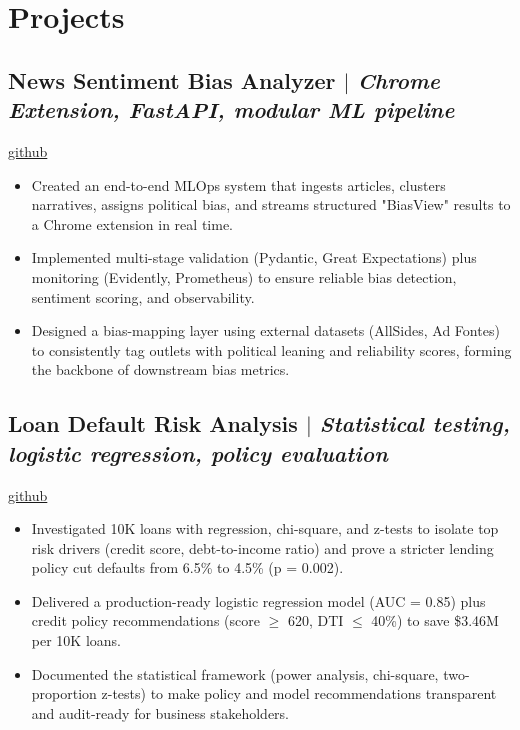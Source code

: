\documentclass[11pt,letterpaper]{article}
\begin{document}
\section*{Projects}

\subsection*{News Sentiment Bias Analyzer $\vert$ \normalfont\textit{Chrome Extension, FastAPI, modular ML pipeline}} \hfill \href{https://github.com/blue-jays/News_Bias_Check_Companion/}{github}
\begin{itemize}[leftmargin=*,noitemsep,topsep=2pt]
    \item Created an end-to-end MLOps system that ingests articles, clusters narratives, assigns political bias, and streams structured "BiasView" results to a Chrome extension in real time.
    \item Implemented multi-stage validation (Pydantic, Great Expectations) plus monitoring (Evidently, Prometheus) to ensure reliable bias detection, sentiment scoring, and observability.
    \item Designed a bias-mapping layer using external datasets (AllSides, Ad Fontes) to consistently tag outlets with political leaning and reliability scores, forming the backbone of downstream bias metrics.
\end{itemize}

\subsection*{Loan Default Risk Analysis $\vert$ \normalfont\textit{Statistical testing, logistic regression, policy evaluation}} \hfill \href{https://github.com/blue-jays/Loan-Default-Risk-Analysis/}{github}
\begin{itemize}[leftmargin=*,noitemsep,topsep=2pt]
    \item Investigated 10K loans with regression, chi-square, and z-tests to isolate top risk drivers (credit score, debt-to-income ratio) and prove a stricter lending policy cut defaults from 6.5\% to 4.5\% (p = 0.002).
    \item Delivered a production-ready logistic regression model (AUC = 0.85) plus credit policy recommendations (score $\geq$ 620, DTI $\leq$ 40\%) to save \$3.46M per 10K loans.
    \item Documented the statistical framework (power analysis, chi-square, two-proportion z-tests) to make policy and model recommendations transparent and audit-ready for business stakeholders.
\end{itemize}
\end{document}
